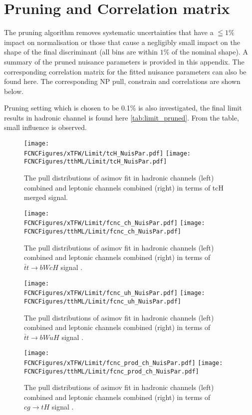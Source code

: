 \section{Pruning and Correlation matrix}
The pruning algorithm removes systematic uncertainties that have a  $\leqq 1\%$ impact on normalisation or those that cause a negligibly small impact on the shape of the final discriminant (all bins are within $1\%$ of the nominal shape). A summary of the pruned nuisance parameters is provided in this appendix.
The corresponding correlation matrix for the fitted nuisance parameters can also be found here. The corresponding NP pull, constrain and correlations are shown below.

Pruning setting  which is chosen to be 0.1\% is also investigated, the final limit results in hadronic channel is found here \ref{tab:limit_pruned}. From the table, small influence is observed.
\begin{figure}[H]
\centering
\texttt{[image: \\FCNCFigures/xTFW/Limit/tcH\_NuisPar.pdf]}
\texttt{[image: \\FCNCFigures/tthML/Limit/tcH\_NuisPar.pdf]}
\caption{ The pull distributions of asimov fit in hadronic channels (left) combined and leptonic channels combined (right) in terms of tcH merged signal.}
\label{fig:tcH_NuisPar}
\end{figure}

\begin{figure}[H]
\centering
\texttt{[image: \\FCNCFigures/xTFW/Limit/fcnc\_ch\_NuisPar.pdf]}
\texttt{[image: \\FCNCFigures/tthML/Limit/fcnc\_ch\_NuisPar.pdf]}
\caption{ The pull distributions of asimov fit in hadronic channels (left) combined and leptonic channels combined (right) in terms of $\bar{t}t\to bWcH$ signal . }
\label{fig:fcnc_ch_NuisPar}
\end{figure}

\begin{figure}[H]
\centering
\texttt{[image: \\FCNCFigures/xTFW/Limit/fcnc\_uh\_NuisPar.pdf]}
\texttt{[image: \\FCNCFigures/tthML/Limit/fcnc\_uh\_NuisPar.pdf]}
\caption{ The pull distributions of asimov fit in hadronic channels (left) combined and leptonic channels combined (right) in terms of $\bar{t}t\to bWuH$ signal . }
\label{fig:fcnc_uh_NuisPar}
\end{figure}

\begin{figure}[H]
\centering
\texttt{[image: \\FCNCFigures/xTFW/Limit/fcnc\_prod\_ch\_NuisPar.pdf]}
\texttt{[image: \\FCNCFigures/tthML/Limit/fcnc\_prod\_ch\_NuisPar.pdf]}
\caption{ The pull distributions of asimov fit in hadronic channels (left) combined and leptonic channels combined (right) in terms of $cg\to tH$ signal . }
\label{fig:fcnc_prod_ch_NuisPar}
\end{figure}

